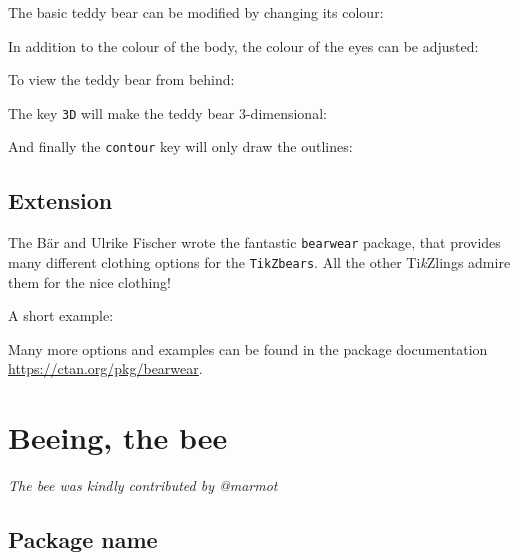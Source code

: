 \documentclass[parskip=half]{scrartcl}
\newcommand{\tikzlings}{Ti\emph{k}Zlings\xspace}
\begin{document}
The basic teddy bear can be modified by changing its colour:
\begin{tcblisting}{}
\bear[body=blue]
\end{tcblisting}

In addition to the colour of the body, the colour of the eyes can be adjusted:
\begin{tcblisting}{}
\bear[eye=red]
\end{tcblisting}

To view the teddy bear from behind:
\begin{tcblisting}{}
\bear[back]
\end{tcblisting}

The key \lstinline|3D| will make the teddy bear 3-dimensional:
\begin{tcblisting}{}
\bear[3D]
\end{tcblisting}

And finally the \lstinline|contour| key will only draw the outlines:
\begin{tcblisting}{}
\bear[contour=black]
\end{tcblisting}

\subsection{Extension}

The B\"ar and Ulrike Fischer wrote the fantastic \lstinline|bearwear| package, that provides many different clothing options for the \lstinline|TikZbears|. All the other \tikzlings admire them for the nice clothing!

A short example:

\begin{tcblisting}{}
\bear
\bearwear[
  long sleeves, 
  shirt=red!80!black
]
\end{tcblisting}

Many more options and examples can be found in the package documentation \url{https://ctan.org/pkg/bearwear}. 

%
%
\clearpage
\section[Bee]{Beeing, the bee}

\emph{The bee was kindly contributed by @marmot}

\subsection{Package name}
\end{document}
